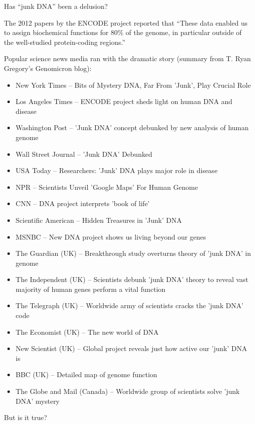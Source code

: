 \documentclass[bluish,slideColor,colorBG,pdf]{prosper}
\begin{document}
\begin{slide}[Replace]{Has ``junk DNA'' been a delusion? }
\vspace{-0.08in}

{
The 2012 papers by the ENCODE project reported that ``These data enabled us to assign biochemical functions for 80\% of the genome,
in particular outside of the well-studied protein-coding regions.''

Popular science news media ran with the dramatic story (summary from T. Ryan
Gregory's Genomicron blog):
\vspace{-0.10in}
\begin{itemize}
\addtolength{\itemsep}{-0.6\baselineskip}
\item New York Times -- Bits of Mystery DNA, Far From 'Junk', Play Crucial Role
\item Los Angeles Times -- ENCODE project sheds light on human DNA and disease
\item Washington Post --  'Junk DNA' concept debunked by new analysis of human genome
\item Wall Street Journal -- 'Junk DNA' Debunked
\item USA Today -- Researchers: 'Junk' DNA plays major role in disease
\item NPR -- Scientists Unveil 'Google Maps' For Human Genome
\item CNN -- DNA project interprets 'book of life'
\item Scientific American -- Hidden Treasures in 'Junk' DNA
\item MSNBC -- New DNA project shows us living beyond our genes
\item The Guardian (UK) -- Breakthrough study overturns theory of 'junk DNA' in genome
\item The Independent (UK) -- Scientists debunk 'junk DNA' theory to reveal vast majority of human genes perform a vital function
\item The Telegraph (UK) -- Worldwide army of scientists cracks the 'junk DNA' code
\item The Economist (UK) -- The new world of DNA
\item New Scientist (UK) -- Global project reveals just how active our 'junk' DNA is
\item BBC (UK) -- Detailed map of genome function
\item The Globe and Mail (Canada) -- Worldwide group of scientists solve 'junk
DNA' mystery
\end{itemize}
}

But is it true?

\end{slide}
\end{document}
